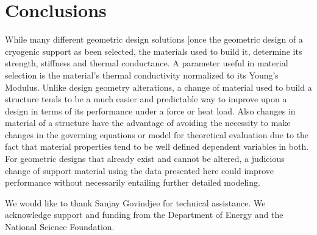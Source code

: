 \documentclass[final]{svjour2}
\begin{document}
\section{Conclusions}
While many different geometric design solutions [once the geometric design of a cryogenic support as been selected, the materials used to build it, determine its strength, stiffness and thermal conductance. A parameter useful in material selection is the material's thermal conductivity normalized to its Young's Modulus.  Unlike design geometry alterations, a change of material used to build a structure tends to be a much easier and predictable way to improve upon a design in terms of its performance under a force or heat load. Also changes in material of a structure have the advantage of avoiding the necessity to make changes in the governing equations or model for theoretical evaluation due to the fact that material properties tend to be well defined dependent variables in both. For geometric designs that already exist and cannot be altered, a judicious change of support material using the data presented here could improve performance without necessarily entailing further detailed modeling.

\begin{acknowledgements}
We would like to thank Sanjay Govindjee for technical assistance. We acknowledge support and funding from the Department of Energy and the National Science Foundation.
\end{acknowledgements}
\end{document}
